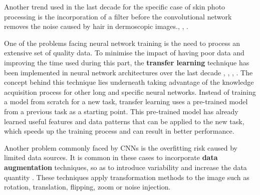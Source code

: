 Another trend used in the last decade for the specific case of skin photo processing is the incorporation of a filter before the convolutional network  removes the noise caused by hair in dermoscopic images.\cite{talavera-martinez_hair_2021}, \cite{bardou_hair_2022}, \cite{kaur_hairlines_2022}.

One of the problems facing neural network training is the need to process an extensive set of quality data. To minimise the impact of having poor data and improving the time used during this part, the \textbf{transfer learning} technique has been implemented in neural network architectures over the last decade \cite{rodrigues_new_2020}, \cite{wall_deep_2020}, \cite{abbes_deep_2021}, \cite{georgakopoulos_detection_2017}. The concept behind this technique lies underneath taking advantage of the knowledge acquisition process for other long and specific neural networks. Instead of training a model from scratch for a new task, transfer learning uses a pre-trained model from a previous task as a starting point. This pre-trained model has already learned useful features and data patterns that can be applied to the new task, which speeds up the training process and can result in better performance. 

Another problem commonly faced by CNNs is the overfitting risk caused by limited data sources. It is common in these cases to incorporate \textbf{data augmentation} techniques, so as to introduce variability and increase the data quantity \cite{shorten_survey_2019}. These techniques apply transformation methods to the image such as rotation, translation, flipping, zoom or noise injection. 

